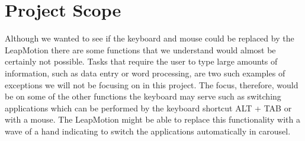 \section{Project Scope}
Although we wanted to see if the keyboard and mouse could be replaced by the LeapMotion there are some functions that we understand would almost be certainly not possible. Tasks that require the user to type large amounts of information, such as data entry or word processing, are two such examples of exceptions we will not be focusing on in this project. The focus, therefore, would be on some of the other functions the keyboard may serve such as switching applications which can be performed by the keyboard shortcut ALT + TAB or with a mouse. The LeapMotion might be able to replace this functionality with a wave of a hand indicating to switch the applications automatically in carousel. 
